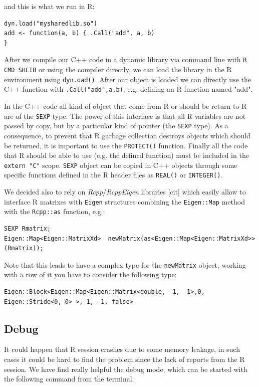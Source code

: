 and this is what we run in R:

\begin{lstlisting}
dyn.load("mysharedlib.so")
add <- function(a, b) { .Call("add", a, b)
}
\end{lstlisting}

After we compile our C++ code in a dynamic library via command line with \verb|R CMD SHLIB| or using the compiler directly, we can load the library in the R environment using \verb|dyn.oad()|. After our object is loaded we can directly use the C++ function with \verb|.Call("add",a,b)|, e.g. defining an R function named "add".

In the C++ code all kind of object that come from R or should be return to R are of the \verb|SEXP| type. The power of this interface is that all R variables are not passed by copy, but by a particular kind of pointer (the \verb|SEXP| type). As a consequence, to prevent that R garbage collection destroys objects which should be returned, it is important to use the \verb|PROTECT()| function. Finally all the code that R should be able to use (e.g. the defined function) must be included in the \verb|extern "C"| scope. \verb|SEXP| object can be copied in C++ objects through some specific functions defined in the R header files as \verb|REAL()| or \verb|INTEGER()|. 
 
\medskip

We decided also to rely on \emph{Rcpp}/\emph{RcppEigen} libraries [cit] which easily allow to interface R matrixes with \verb|Eigen| structures combining the \verb|Eigen::Map| method with the \verb|Rcpp::as| function, e.g.:

\begin{lstlisting}
SEXP Rmatrix;
Eigen::Map<Eigen::MatrixXd>  newMatrix(as<Eigen::Map<Eigen::MatrixXd>> (Rmatrix));
\end{lstlisting}

Note that this leads to have a complex type for the \verb|newMatrix| object, working with a row of it you have to consider the following type:

\begin{lstlisting}
Eigen::Block<Eigen::Map<Eigen::Matrix<double, -1, -1>,0, Eigen::Stride<0, 0> >, 1, -1, false>
\end{lstlisting}

\subsection{Debug}
It could happen that R session crashes due to some memory leakage, in such cases it could be hard to find the problem since the lack of reports from the R session. We have find really helpful the debug mode, which can be started with the following command from the terminal:

